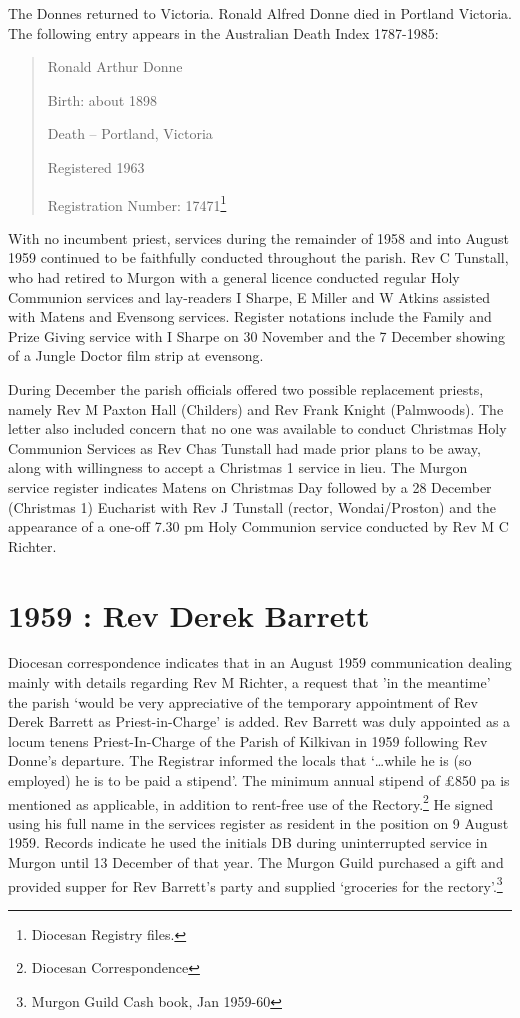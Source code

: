 The Donnes returned to Victoria. Ronald Alfred Donne died in Portland Victoria. The following entry appears in the Australian Death Index 1787-1985:

\begin{quote}
Ronald Arthur Donne

Birth: about 1898

Death -- Portland, Victoria

Registered 1963

Registration Number: 17471\footnote{Diocesan Registry files.}
\end{quote}

With no incumbent priest, services during the remainder of 1958 and into August 1959 continued to be faithfully conducted throughout the parish. Rev C Tunstall, who had retired to Murgon with a general licence conducted regular Holy Communion services and lay-readers I Sharpe, E Miller and W Atkins assisted with Matens and Evensong services. Register notations include the Family and Prize Giving service with I Sharpe on 30 November and the 7 December showing of a Jungle Doctor film strip at evensong.

During December the parish officials offered two possible replacement priests, namely Rev M Paxton Hall (Childers) and Rev Frank Knight (Palmwoods). The letter also included concern that no one was available to conduct Christmas Holy Communion Services as Rev Chas Tunstall had made prior plans to be away, along with willingness to accept a Christmas 1 service in lieu. The Murgon service register indicates Matens on Christmas Day followed by a 28 December (Christmas 1) Eucharist with Rev J Tunstall (rector, Wondai/Proston) and the appearance of a one-off 7.30 pm Holy Communion service conducted by Rev M C Richter.

\hypertarget{rev-derek-barrett}{%
\section{1959 : Rev Derek Barrett}\label{rev-derek-barrett}}

Diocesan correspondence indicates that in an August 1959 communication dealing mainly with details regarding Rev M Richter, a request that 'in the meantime' the parish `would be very appreciative of the temporary appointment of Rev Derek Barrett as Priest-in-Charge' is added. Rev Barrett was duly appointed as a locum tenens Priest-In-Charge of the Parish of Kilkivan in 1959 following Rev Donne's departure. The Registrar informed the locals that `\ldots while he is (so employed) he is to be paid a stipend'. The minimum annual stipend of £850 pa is mentioned as applicable, in addition to rent-free use of the Rectory.\footnote{Diocesan Correspondence} He signed using his full name in the services register as resident in the position on 9 August 1959. Records indicate he used the initials DB during uninterrupted service in Murgon until 13 December of that year. The Murgon Guild purchased a gift and provided supper for Rev Barrett's party and supplied `groceries for the rectory'.\footnote{Murgon Guild Cash book, Jan 1959-60}

